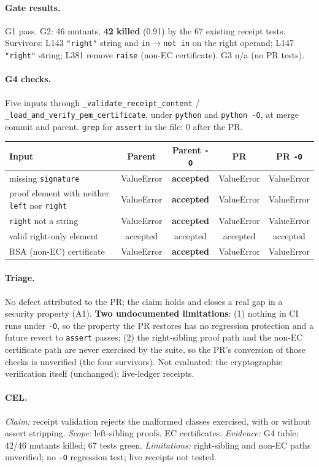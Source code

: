 \documentclass[11pt,a4paper]{article}
\newcommand{\code}[1]{\texttt{#1}}
\newcommand{\sub}[1]{\paragraph{#1}}
\begin{document}
\sub{Gate results.} G1 pass. G2: 46 mutants, \textbf{42 killed} (0.91) by the 67 existing receipt tests. Survivors: L143 \code{"right"} string and \code{in$\to$not in} on the right operand; L147 \code{"right"} string; L381 remove \code{raise} (non-EC certificate). G3 n/a (no PR tests).

\sub{G4 checks.} Five inputs through \code{\_validate\_receipt\_content} / \code{\_load\_and\_verify\_pem\_certificate}, under \code{python} and \code{python -O}, at merge commit and parent. \code{grep} for \code{assert} in the file: 0 after the PR.
\begin{center}\small\begin{tabular}{l c c c c}
\toprule Input & Parent & Parent \code{-O} & PR & PR \code{-O} \\ \midrule
missing \code{signature} & ValueError & \textbf{accepted} & ValueError & ValueError \\
proof element with neither \code{left} nor \code{right} & ValueError & \textbf{accepted} & ValueError & ValueError \\
\code{right} not a string & ValueError & \textbf{accepted} & ValueError & ValueError \\
valid right-only element & accepted & accepted & accepted & accepted \\
RSA (non-EC) certificate & ValueError & \textbf{accepted} & ValueError & ValueError \\
\bottomrule\end{tabular}\end{center}

\sub{Triage.} No defect attributed to the PR; the claim holds and closes a real gap in a security property (A1). \textbf{Two undocumented limitations}: (1) nothing in CI runs under \code{-O}, so the property the PR restores has no regression protection and a future revert to \code{assert} passes; (2) the right-sibling proof path and the non-EC certificate path are never exercised by the suite, so the PR's conversion of those checks is unverified (the four survivors). Not evaluated: the cryptographic verification itself (unchanged); live-ledger receipts.

\sub{CEL.} \emph{Claim:} receipt validation rejects the malformed classes exercised, with or without assert stripping. \emph{Scope:} left-sibling proofs, EC certificates. \emph{Evidence:} G4 table; 42/46 mutants killed; 67 tests green. \emph{Limitations:} right-sibling and non-EC paths unverified; no \code{-O} regression test; live receipts not tested.
\end{document}
